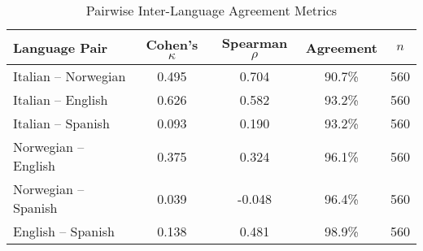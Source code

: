 \documentclass{article}
\begin{document}
\begin{table}[htbp]
\centering
\caption{Pairwise Inter-Language Agreement Metrics}
\label{tab:pairwise_language_agreement}
\begin{tabular}{lcccc}
\toprule
Language Pair & Cohen's $\kappa$ & Spearman $\rho$ & Agreement & $n$ \\
\midrule
Italian -- Norwegian & 0.495 & 0.704 & 90.7\% & 560 \\
Italian -- English & 0.626 & 0.582 & 93.2\% & 560 \\
Italian -- Spanish & 0.093 & 0.190 & 93.2\% & 560 \\
Norwegian -- English & 0.375 & 0.324 & 96.1\% & 560 \\
Norwegian -- Spanish & 0.039 & -0.048 & 96.4\% & 560 \\
English -- Spanish & 0.138 & 0.481 & 98.9\% & 560 \\
\bottomrule
\end{tabular}
\end{table}
\end{document}
